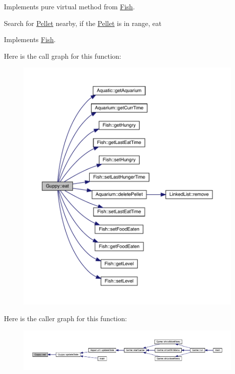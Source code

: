 Implements pure virtual method from \mbox{\hyperlink{class_fish}{Fish}}. 

Search for \mbox{\hyperlink{class_pellet}{Pellet}} nearby, if the \mbox{\hyperlink{class_pellet}{Pellet}} is in range, eat 

Implements \mbox{\hyperlink{class_fish_af209980bd39b8de9b4bb38b7ad4edd04}{Fish}}.

Here is the call graph for this function\+:\nopagebreak
\begin{figure}[H]
\begin{center}
\leavevmode
\includegraphics[width=350pt]{class_guppy_afe934262a0988e4ad041f4ed3a1a7e02_cgraph}
\end{center}
\end{figure}
Here is the caller graph for this function\+:
\nopagebreak
\begin{figure}[H]
\begin{center}
\leavevmode
\includegraphics[width=350pt]{class_guppy_afe934262a0988e4ad041f4ed3a1a7e02_icgraph}
\end{center}
\end{figure}
\mbox{\label{class_guppy_ae6002948d74b3741bed34a7311be4377}} 
